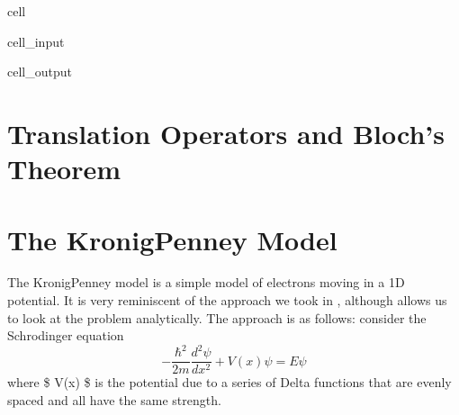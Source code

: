 \documentclass[letterpaper,10pt,english]{jupyterBook}
\begin{document}
\begin{sphinxuseclass}{cell}
\begin{sphinxVerbatimInput}
\begin{sphinxuseclass}{cell_input}
\begin{sphinxVerbatim}[commandchars=\\\{\}]
 
\end{sphinxVerbatim}

\end{sphinxuseclass}\end{sphinxVerbatimInput}
\begin{sphinxVerbatimOutput}

\begin{sphinxuseclass}{cell_output}
\begin{sphinxVerbatim}
\end{sphinxVerbatim}

\noindent{}

\end{sphinxuseclass}\end{sphinxVerbatimOutput}

\end{sphinxuseclass}

\chapter{Translation Operators and Bloch’s Theorem}
\label{\detokenize{translation-operator:translation-operators-and-bloch-s-theorem}}\label{\detokenize{translation-operator::doc}}

\chapter{The Kronig\sphinxhyphen{}Penney Model}
\label{\detokenize{kronig-penney:the-kronig-penney-model}}\label{\detokenize{kronig-penney::doc}}
\sphinxAtStartPar
The Kronig\sphinxhyphen{}Penney model is a simple model of electrons moving in a 1D potential. It is very reminiscent of the approach we took in {\hyperref[\detokenize{Section6:test-label}]{}}, although allows us to look at the problem analytically. The approach is as follows: consider the Schrodinger equation
\label{equation:kronig-penney:d1ab0c3f-7b44-475f-8692-70a6fcb5526b}\begin{equation}
- \frac{\hbar^2}{2m} \frac{d^2 \psi}{dx^2} + V(x) \psi = E \psi 
\end{equation}
\sphinxAtStartPar
where \$ V(x) \$ is the potential due to a series of Delta functions that are evenly spaced and all have the same strength.
\end{document}
